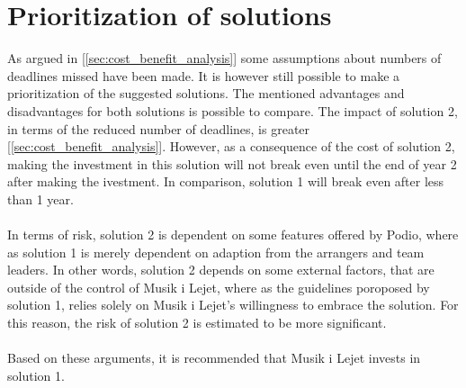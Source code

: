 \section{Prioritization of solutions}
As argued in [\ref{sec:cost_benefit_analysis}] some assumptions about numbers of deadlines missed have been made. It is however still possible to make a prioritization of the suggested solutions.
The mentioned advantages and disadvantages for both solutions is possible to compare. The impact of solution 2, in terms of the reduced number of deadlines, is greater [\ref{sec:cost_benefit_analysis}]. However, as a consequence of the cost of solution 2, making the investment in this solution will not break even until the end of year 2 after making the ivestment. In comparison, solution 1 will break even after less than 1 year.
\\ \\
In terms of risk, solution 2 is dependent on some features offered by Podio, where as solution 1 is merely dependent on adaption from the arrangers and team leaders. In other words, solution 2 depends on some external factors, that are outside of the control of Musik i Lejet, where as the guidelines poroposed by solution 1, relies solely on Musik i Lejet's willingness to embrace the solution. For this reason, the risk of solution 2 is estimated to be more significant.
\\ \\
Based on these arguments, it is recommended that Musik i Lejet invests in solution 1. 


